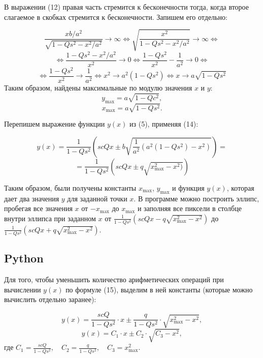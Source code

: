 \documentclass[14pt, a4paper]{article}
\begin{document}
В выражении (12) правая часть стремится к бесконечности тогда, когда второе слагаемое в скобках стремится к бесконечности. Запишем его отдельно:

$$
	\frac{xb/a^2}{\sqrt{1-Qs^2-x^2/a^2}} \xrightarrow[]{} \infty \Leftrightarrow	\sqrt{\frac{x^2}{1-Qs^2-x^2/a^2}} \xrightarrow[]{} \infty \Leftrightarrow
$$
$$
	\Leftrightarrow \frac{1-Qs^2-x^2/a^2}{x^2} \xrightarrow[]{} 0 \Leftrightarrow \frac{1-Qs^2}{x^2} - \frac{1}{a^2} \xrightarrow[]{} 0 \Leftrightarrow
$$
$$
	\Leftrightarrow \frac{1-Qs^2}{x^2} \xrightarrow[]{} \frac{1}{a^2} \Leftrightarrow x^2 \xrightarrow[]{} a^2(1-Qs^2) \Leftrightarrow x \xrightarrow[]{} a\sqrt{1-Qs^2}
$$
Таким образом, найдены максимальные по модулю значения $x$ и $y$:
\begin{equation}
y_{\text{max}} = a\sqrt{1-Qc^2},
\end{equation}
\begin{equation}
x_{\text{max}} = a\sqrt{1-Qs^2}.
\end{equation}

Перепишем выражение функции $y(x)$ из (5), применяя (14):

$$
	y(x) = \frac{1}{1-Qs^2} \left( scQx \pm b\sqrt{\frac{1}{a^2}(a^2(1-Qs^2) - x^2)} \right) =
$$
\begin{equation}
	= \frac{1}{1-Qs^2} \left( scQx \pm q\sqrt{x_{\text{max}}^2 - x^2)} \right)
\end{equation}

Таким образом, были получены константы $x_{\text{max}}$, $y_{\text{max}}$ и функция $y(x)$, которая дает два значения $y$ для заданной точки $x$. В программе можно построить эллипс, пробегая все значения $x$ от $-x_{\text{max}}$ до $x_{\text{max}}$ и заполняя все пиксели в столбце внутри эллипса при заданном $x$ от $\frac{1}{1-Qs^2}\left( scQx - q\sqrt{x_{\text{max}}^2-x^2} \right)$ до $\frac{1}{1-Qs^2}\left( scQx + q\sqrt{x_{\text{max}}^2-x^2} \right)$.

\newpage

\subsection*{Python}
Для того, чтобы уменьшить количество арифметических операций при вычислении $y(x)$ по формуле (15), выделим в ней константы (которые можно вычислить отдельно заранее):

$$
	y(x) = \frac{scQ}{1-Qs^2} \cdot x \pm \frac{q}{1-Qs^2} \cdot \sqrt{x_{\text{max}}^2-x^2},
$$
$$
	y(x) = C_1 \cdot x \pm C_2 \cdot \sqrt{C_3 - x^2},
$$
где $C_1 = \frac{scQ}{1-Qs^2}, \quad C_2 = \frac{q}{1-Qs^2}, \quad C_3=x_{\text{max}}^2$.
\end{document}
